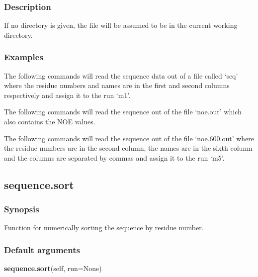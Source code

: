 \subsubsection{Description}

If no directory is given, the file will be assumed to be in the current working directory.


\subsubsection{Examples}

The following commands will read the sequence data out of a file called `seq' where the
residue numbers and names are in the first and second columns respectively and assign it to
the run `m1'.




The following commands will read the sequence out of the file `noe.out' which also contains
the NOE values.




The following commands will read the sequence out of the file `noe.600.out' where the
residue numbers are in the second column, the names are in the sixth column and the columns
are separated by commas and assign it to the run `m5'.




\newpage

\subsection{sequence.sort}


\subsubsection{Synopsis}

Function for numerically sorting the sequence by residue number.

\subsubsection{Default arguments}

\textsf{\textbf{sequence.sort}(self, run=None)}


